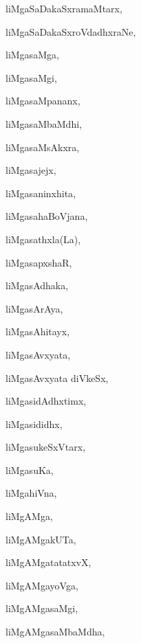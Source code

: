 \begin{multicols}{3}
{\noindent
{liMgaSaDakaSxramaMtarx}, \pageref{liMgaSaDakaSxramaMtarx}

\noindent
{liMgaSaDakaSxroVdadhxraNe}, \pageref{liMgaSaDakaSxroVdadhxraNe}

\noindent
{liMgasaMga}, \pageref{liMgasaMga}

\noindent
{liMgasaMgi}, \pageref{liMgasaMgi}

\noindent
{liMgasaMpananx}, \pageref{liMgasaMpananx}

\noindent
{liMgasaMbaMdhi}, \pageref{liMgasaMbaMdhi}

\noindent
{liMgasaMsAkxra}, \pageref{liMgasaMsAkxra}

\noindent
{liMgasajejx}, \pageref{liMgasajejx}

\noindent
{liMgasaninxhita}, \pageref{liMgasaninxhita}

\noindent
{liMgasahaBoVjana}, \pageref{liMgasahaBoVjana}

\noindent
{liMgasathxla(La)}, \pageref{liMgasathxla(La)}

\noindent
{liMgasapxshaR}, \pageref{liMgasapxshaR}

\noindent
{liMgasAdhaka}, \pageref{liMgasAdhaka}

\noindent
{liMgasArAya}, \pageref{liMgasArAya}

\noindent
{liMgasAhitayx}, \pageref{liMgasAhitayx}

\noindent
{liMgasAvxyata}, \pageref{liMgasAvxyata}

\noindent
{liMgasAvxyata diVkeSx}, \pageref{liMgasAvxyatadiVkeSx}

\noindent
{liMgasidAdhxtimx}, \pageref{liMgasidAdhxtimx}

\noindent
{liMgasididhx}, \pageref{liMgasididhx}

\noindent
{liMgasukeSxVtarx}, \pageref{liMgasukeSxVtarx}

\noindent
{liMgasuKa}, \pageref{liMgasuKa}

\noindent
{liMgahiVna}, \pageref{liMgahiVna}

\noindent
{liMgAMga}, \pageref{liMgAMga}

\noindent
{liMgAMgakUTa}, \pageref{liMgAMgakUTa}

\noindent
{liMgAMgatatatxvX}, \pageref{liMgAMgatatatxvX}

\noindent
{liMgAMgayoVga}, \pageref{liMgAMgayoVga}

\noindent
{liMgAMgasaMgi}, \pageref{liMgAMgasaMgi}

\noindent
{liMgAMgasaMbaMdha}, \pageref{liMgAMgasaMbaMdha}

}
\end{multicols}

